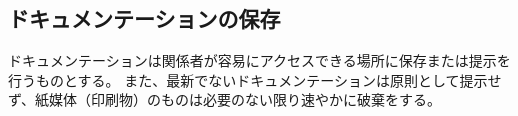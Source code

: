 \subsection{ドキュメンテーションの保存}
ドキュメンテーションは関係者が容易にアクセスできる場所に保存または提示を行うものとする。
また、最新でないドキュメンテーションは原則として提示せず、紙媒体（印刷物）のものは必要のない限り速やかに破棄をする。


